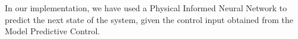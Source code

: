 In our implementation, we have used a Physical Informed Neural Network to predict the next state of the system, given the control input obtained from the Model Predictive Control.
